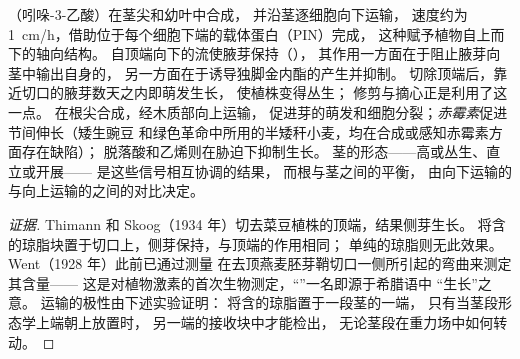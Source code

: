 \begin{proposition}[生长素与顶端优势]\label{prop:b2:plant-meristems:apical}
\emph{}（吲哚-3-乙酸）在茎尖和幼叶中合成，
并沿茎逐细胞向下运输，
速度约为 \qty{1}{cm/h}，借助位于每个细胞下端的载体蛋白（PIN）完成，
这种\emph{}赋予植物自上而下的轴向结构。
自顶端向下的流使腋芽保持（\emph{}），
其作用一方面在于阻止腋芽向茎中输出自身的，
另一方面在于诱导独脚金内酯的产生并抑制。
切除顶端后，靠近切口的腋芽数天之内即萌发生长，
使植株变得丛生；
修剪与摘心正是利用了这一点。
\emph{}在根尖合成，经木质部向上运输，
促进芽的萌发和细胞分裂；\emph{赤霉素}促进节间伸长（矮生豌豆
和绿色革命中所用的半矮秆小麦，均在合成或感知赤霉素方面存在缺陷）；
脱落酸和乙烯则在胁迫下抑制生长。
茎的形态——高或丛生、直立或开展——
是这些信号相互协调的结果，
而根与茎之间的平衡，
由向下运输的与向上运输的之间的对比决定。
\end{proposition}
\begin{proof}[证据]
Thimann 和 Skoog（1934 年）切去菜豆植株的顶端，结果侧芽生长。
将含的琼脂块置于切口上，侧芽保持，与顶端的作用相同；
单纯的琼脂则无此效果。Went（1928 年）此前已通过测量
在去顶燕麦胚芽鞘切口一侧所引起的弯曲来测定其含量——
这是对植物激素的首次生物测定，“”一名即源于希腊语中
“生长”之意。
运输的极性由下述实验证明：
将含的琼脂置于一段茎的一端，
只有当茎段形态学上端朝上放置时，
另一端的接收块中才能检出，
无论茎段在重力场中如何转动。
\end{proof}


